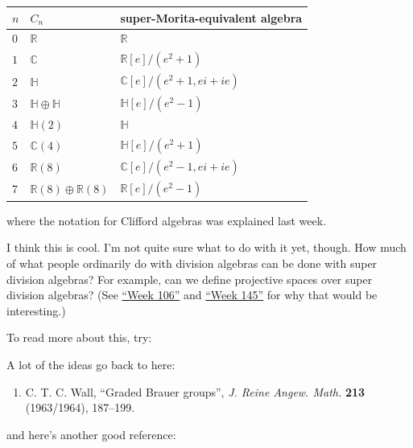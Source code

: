 \documentclass{article}
\def\tightlist{}
\renewcommand{\texttt}[1]{%
  \begingroup
  \ttfamily
  \begingroup\lccode`~=`/\lowercase{\endgroup\def~}{/\discretionary{}{}{}}%
  \begingroup\lccode`~=`[\lowercase{\endgroup\def~}{[\discretionary{}{}{}}%
  \begingroup\lccode`~=`.\lowercase{\endgroup\def~}{.\discretionary{}{}{}}%
  \catcode`/=\active\catcode`[=\active\catcode`.=\active
  \scantokens{#1\noexpand}%
  \endgroup
}
\begin{document}
\begin{longtable}[]{@{}lll@{}}
\toprule
\(n\) & \(C_n\) & super-Morita-equivalent algebra\tabularnewline
\midrule
\endhead
\(0\) & \(\mathbb{R}\) & \(\mathbb{R}\)\tabularnewline
\(1\) & \(\mathbb{C}\) & \(\mathbb{R}[e]/(e^2+1)\)\tabularnewline
\(2\) & \(\mathbb{H}\) & \(\mathbb{C}[e]/(e^2+1,ei+ie)\)\tabularnewline
\(3\) & \(\mathbb{H}\oplus\mathbb{H}\) &
\(\mathbb{H}[e]/(e^2-1)\)\tabularnewline
\(4\) & \(\mathbb{H}(2)\) & \(\mathbb{H}\)\tabularnewline
\(5\) & \(\mathbb{C}(4)\) & \(\mathbb{H}[e]/(e^2+1)\)\tabularnewline
\(6\) & \(\mathbb{R}(8)\) &
\(\mathbb{C}[e]/(e^2-1,ei+ie)\)\tabularnewline
\(7\) & \(\mathbb{R}(8)\oplus\mathbb{R}(8)\) &
\(\mathbb{R}[e]/(e^2-1)\)\tabularnewline
\bottomrule
\end{longtable}

where the notation for Clifford algebras was explained last week.

I think this is cool. I'm not quite sure what to do with it yet, though.
How much of what people ordinarily do with division algebras can be done
with super division algebras? For example, can we define projective
spaces over super division algebras? (See
\protect\hyperlink{week106}{``Week 106''} and
\protect\hyperlink{week145}{``Week 145''} for why that would be
interesting.)

To read more about this, try:


A lot of the ideas go back to here:

\begin{enumerate}
\def\labelenumi{\arabic{enumi})}
\setcounter{enumi}{1}
\tightlist
\item
  C. T. C. Wall, ``Graded Brauer groups'', \emph{J. Reine Angew. Math.}
  \textbf{213} (1963/1964), 187--199.
\end{enumerate}

and here's another good reference:

\end{document}
